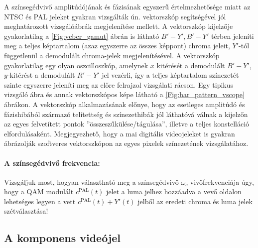 A színsegédvivő amplitúdójának és fázisának egyszerű értelmezhetősége miatt az NTSC és PAL jeleket gyakran vizsgálták ún. vektorszkóp segítségével jól meghatározott vizsgálóábrák megjelenítése mellett.
A vektorszkóp kijelzője gyakorlatilag a \ref{Fig:ycbcr_gamut} ábrán is látható $B'-Y', B'-Y'$ térben jeleníti meg a teljes képtartalom (azaz egyszerre az összes képpont) chroma jeleit, $Y'$-tól függetlenül a demodulált chroma-jelek megjelenítésével.
A vektorszkóp gyakorlatilag egy olyan oszcilloszkóp, amelynek $x$ kitérését a demodulált $B'-Y'$, $y$-kitérést a demodulált $R'-Y'$ jel vezérli, így a teljes képtartalom színezetét szinte egyszerre jeleníti meg az előre felrajzol vizsgálati rácson.
Egy tipikus vizsgáló ábra és annak vektorszkópos képe látható a \ref{Fig:bar_pattern_vscope} ábrákon.
A vektorszkóp alkalmazásának előnye, hogy az esetleges amplitúdó és fázishibából származó telítettség és színezethibák jól láthatóvá válnak a kijelzőn az egyes felvetített pontok ''összeszűkülése/tágulása'', illetve a teljes konstelláció elfordulásaként.
Megjegyezhető, hogy a mai digitális videojeleket is gyakran ábrázolják szoftveres vektorszkópon az egyes pixelek színezetének vizsgálatához.

\paragraph{A színsegédvivő frekvencia:}
Vizsgáljuk most, hogyan választható meg a színsegédvivő $\omega_c$ vivőfrekvenciája úgy, hogy a QAM modulált $c^{\mathrm{PAL}}(t)$ jelet a luma jelhez hozzáadva a vevő oldalon lehetséges legyen a vett $c^{\mathrm{PAL}}(t) + Y'(t)$ jelből az eredeti chroma és luma jelek szétválasztása!




\subsection{A komponens videójel}
